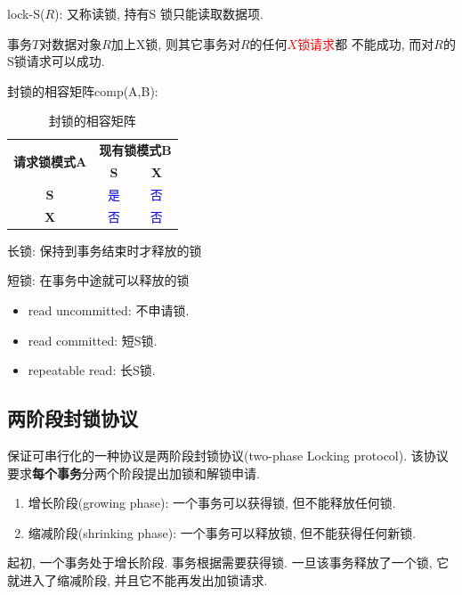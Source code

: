 \begin{definition}
  lock-S($R$): 又称读锁, 持有S
锁只能读取数据项.

事务$T$对数据对象$R$加上X锁, 则其它事务对$R$的任何\textcolor{red}{$X$锁请求}都
不能成功, 而对$R$的S锁请求可以成功.
\end{definition}

封锁的相容矩阵comp(A,B):
\begin{table}[H]
    \centering
    \begin{tabular}{|c|c|c|}
        \hline
        \multirow{2}{*}{\textbf{请求锁模式A}} & \multicolumn{2}{c|}{\textbf{现有锁模式B}} \\ \cline{2-3}
         & \textbf{S} & \textbf{X} \\ \hline
        \textbf{S} & \cellcolor{red!10}\textcolor{blue}{是} & \textcolor{blue}{否} \\ \hline
        \textbf{X} & \textcolor{blue}{否} & \textcolor{blue}{否} \\ \hline
    \end{tabular}
    \caption{封锁的相容矩阵}
    \label{tab:lock_compatibility}
\end{table}

长锁: 保持到事务结束时才释放的锁

短锁: 在事务中途就可以释放的锁

\begin{itemize}
  \item read uncommitted: 不申请锁.
  \item read committed: 短S锁.
  \item repeatable read: 长S锁.
\end{itemize}

\subsection{两阶段封锁协议}

保证可串行化的一种协议是两阶段封锁协议(two-phase Locking protocol). 该协议要求\textbf{每个事务}分两个阶段提出加锁和解锁申请.
\begin{enumerate}
    \item 增长阶段(growing phase): 一个事务可以获得锁, 但不能释放任何锁.
    \item 缩减阶段(shrinking phase): 一个事务可以释放锁, 但不能获得任何新锁.
\end{enumerate}
起初, 一个事务处于增长阶段. 事务根据需要获得锁. 一旦该事务释放了一个锁, 它就进入了缩减阶段, 并且它不能再发出加锁请求.

